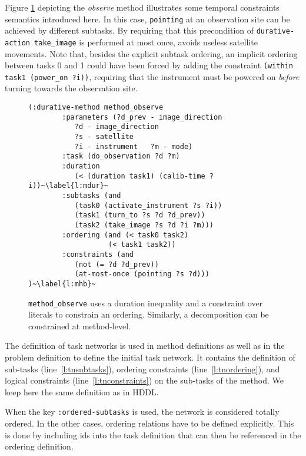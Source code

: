 \documentclass[letterpaper]{article} %
\begin{document}
Figure \ref{pddl_durative_m_con} depicting the \textit{observe} method illustrates some temporal constraints semantics introduced here.
In this case, \texttt{pointing} at an observation site can be achieved by different subtasks. By requiring that this precondition of \mbox{\small\lstinline[language={pddl},basicstyle=\ttfamily]|durative-action take_image|} is performed  at most once, avoids useless satellite movements.
Note that, besides the explicit subtask ordering, an implicit ordering between tasks 0 and 1 could have been forced by adding the constraint  \mbox{\small\lstinline[language={pddl},basicstyle=\ttfamily]|(within task1 (power_on ?i))|}, requiring that the instrument must be powered on \emph{before} turning towards the observation site.
%
\begin{figure}[h!]
	\begin{lstlisting}[language=pddl, basicstyle=\fontsize{8.5}{10}\selectfont\ttfamily, escapechar=~]
	(:durative-method method_observe
		:parameters (?d_prev - image_direction
		   ?d - image_direction
		   ?s - satellite
		   ?i - instrument   ?m - mode)
		:task (do_observation ?d ?m)
		:duration
		   (< (duration task1) (calib-time ?i))~\label{l:mdur}~
		:subtasks (and
		   (task0 (activate_instrument ?s ?i))
		   (task1 (turn_to ?s ?d ?d_prev))
		   (task2 (take_image ?s ?d ?i ?m)))
		:ordering (and (< task0 task2)
                   (< task1 task2))
		:constraints (and
		   (not (= ?d ?d_prev))
		   (at-most-once (pointing ?s ?d))) )~\label{l:mhb}~
	\end{lstlisting}
	\caption{\texttt{method\_observe} uses a duration inequality and a constraint over literals to constrain an ordering. Similarly, a decomposition can be constrained at method-level.\label{pddl_durative_m_con}}
\end{figure}


%
%
The definition of task networks is used in method definitions as well as in the problem definition to define the initial task network. It contains the definition of sub-tasks (line~\ref{l:tnsubtasks}), ordering constraints (line~\ref{l:tnordering}), and logical constraints (line~\ref{l:tnconstraints}) on the sub-tasks of the method. We keep here the same definition as in HDDL.

When the key \verb+:ordered-subtasks+ is used, the network is considered totally ordered. In the other cases, ordering relations have to be defined explicitly. This is done by including ids into the task definition that can then be referenced in the ordering definition.
\end{document}
